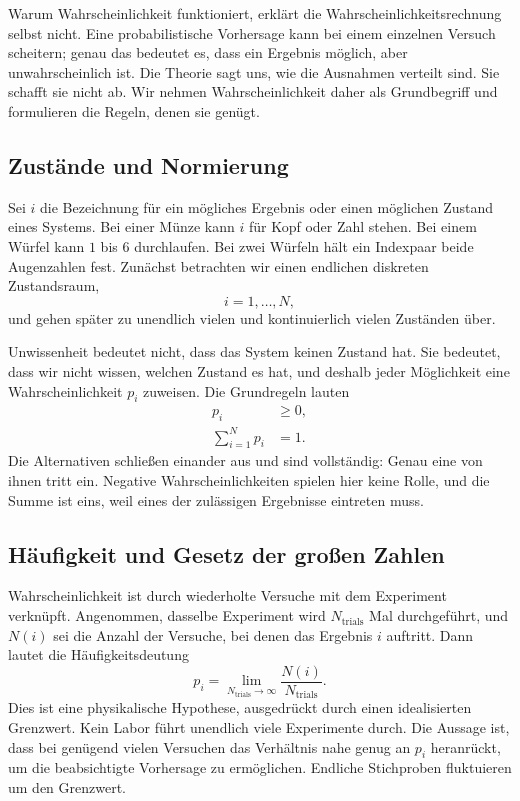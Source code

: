 Warum Wahrscheinlichkeit funktioniert, erklärt die Wahrscheinlichkeitsrechnung selbst nicht. Eine probabilistische Vorhersage kann bei einem einzelnen Versuch scheitern; genau das bedeutet es, dass ein Ergebnis möglich, aber unwahrscheinlich ist. Die Theorie sagt uns, wie die Ausnahmen verteilt sind. Sie schafft sie nicht ab. Wir nehmen Wahrscheinlichkeit daher als Grundbegriff und formulieren die Regeln, denen sie genügt.

\subsection{Zustände und Normierung}

Sei \(i\) die Bezeichnung für ein mögliches Ergebnis oder einen möglichen Zustand eines Systems. Bei einer Münze kann \(i\) für Kopf oder Zahl stehen. Bei einem Würfel kann \(1\) bis \(6\) durchlaufen. Bei zwei Würfeln hält ein Indexpaar beide Augenzahlen fest. Zunächst betrachten wir einen endlichen diskreten Zustandsraum,
\begin{equation}
 i=1,\ldots,N,
\end{equation}
und gehen später zu unendlich vielen und kontinuierlich vielen Zuständen über.

Unwissenheit bedeutet nicht, dass das System keinen Zustand hat. Sie bedeutet, dass wir nicht wissen, welchen Zustand es hat, und deshalb jeder Möglichkeit eine Wahrscheinlichkeit \(p_i\) zuweisen. Die Grundregeln lauten
\begin{align}
 p_i &\geq 0, \label{eq:sm1-prob-positive}\\
 \sum_{i=1}^{N}p_i &=1. \label{eq:sm1-prob-normalization}
\end{align}
Die Alternativen schließen einander aus und sind vollständig: Genau eine von ihnen tritt ein. Negative Wahrscheinlichkeiten spielen hier keine Rolle, und die Summe ist eins, weil eines der zulässigen Ergebnisse eintreten muss.

\subsection{Häufigkeit und Gesetz der großen Zahlen}

Wahrscheinlichkeit ist durch wiederholte Versuche mit dem Experiment verknüpft. Angenommen, dasselbe Experiment wird \(N_{\mathrm{trials}}\) Mal durchgeführt, und \(N(i)\) sei die Anzahl der Versuche, bei denen das Ergebnis \(i\) auftritt. Dann lautet die Häufigkeitsdeutung
\begin{equation}
 p_i=
 \lim_{N_{\mathrm{trials}}\to\infty}
 \frac{N(i)}{N_{\mathrm{trials}}}.
 \label{eq:sm1-frequency}
\end{equation}
Dies ist eine physikalische Hypothese, ausgedrückt durch einen idealisierten Grenzwert. Kein Labor führt unendlich viele Experimente durch. Die Aussage ist, dass bei genügend vielen Versuchen das Verhältnis nahe genug an \(p_i\) heranrückt, um die beabsichtigte Vorhersage zu ermöglichen. Endliche Stichproben fluktuieren um den Grenzwert.

